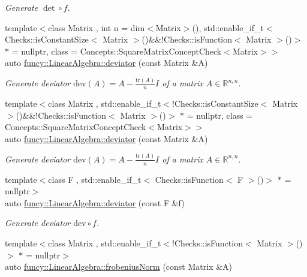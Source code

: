 \begin{DoxyCompactItemize}
\begin{DoxyCompactList}\small\item\em Generate $\det\circ f$. \end{DoxyCompactList}\item 
{\footnotesize template$<$class Matrix , int n = dim$<$\-Matrix$>$(), std\-::enable\-\_\-if\-\_\-t$<$ Checks\-::is\-Constant\-Size$<$ Matrix $>$()\&\&!\-Checks\-::is\-Function$<$ Matrix $>$()$>$ $\ast$  = nullptr, class  = Concepts\-::\-Square\-Matrix\-Concept\-Check$<$\-Matrix$>$$>$ }\\auto \hyperlink{group__LinearAlgebraGroup_gad2d6691b7daf489bbb624be390d79a64}{funcy\-::\-Linear\-Algebra\-::deviator} (const Matrix \&A)
\begin{DoxyCompactList}\small\item\em Generate deviator $ \mathrm{dev}(A) = A - \frac{\mathrm{tr}(A)}{n}I $ of a matrix $ A\in\mathbb{R}^{n,n} $. \end{DoxyCompactList}\item 
{\footnotesize template$<$class Matrix , std\-::enable\-\_\-if\-\_\-t$<$!\-Checks\-::is\-Constant\-Size$<$ Matrix $>$()\&\&!\-Checks\-::is\-Function$<$ Matrix $>$()$>$ $\ast$  = nullptr, class  = Concepts\-::\-Square\-Matrix\-Concept\-Check$<$\-Matrix$>$$>$ }\\auto \hyperlink{group__LinearAlgebraGroup_ga25f215bc2f65c8681770fa40a6de5bf8}{funcy\-::\-Linear\-Algebra\-::deviator} (const Matrix \&A)
\begin{DoxyCompactList}\small\item\em Generate deviator $ \mathrm{dev}(A) = A - \frac{\mathrm{tr}(A)}{n}I $ of a matrix $ A\in\mathbb{R}^{n,n} $. \end{DoxyCompactList}\item 
{\footnotesize template$<$class F , std\-::enable\-\_\-if\-\_\-t$<$ Checks\-::is\-Function$<$ F $>$()$>$ $\ast$  = nullptr$>$ }\\auto \hyperlink{group__LinearAlgebraGroup_ga26e59dc471450a6eae901aed5f975261}{funcy\-::\-Linear\-Algebra\-::deviator} (const F \&f)
\begin{DoxyCompactList}\small\item\em Generate deviator $ \mathrm{dev}\circ f$. \end{DoxyCompactList}\item 
{\footnotesize template$<$class Matrix , std\-::enable\-\_\-if\-\_\-t$<$!\-Checks\-::is\-Function$<$ Matrix $>$()$>$ $\ast$  = nullptr$>$ }\\auto \hyperlink{group__LinearAlgebraGroup_gadd3d66efe1da1c662ef080bfe25fa2b6}{funcy\-::\-Linear\-Algebra\-::frobenius\-Norm} (const Matrix \&A)

\end{DoxyCompactItemize}
